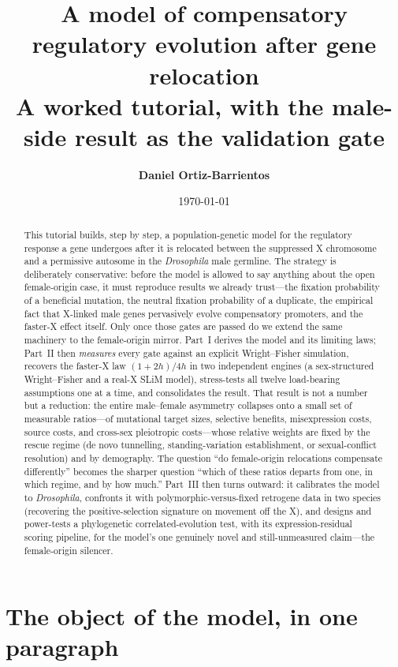 \documentclass[11pt,a4paper]{article}
\title{\textbf{A model of compensatory regulatory evolution after gene relocation}\\[3pt]
\large A worked tutorial, with the male-side result as the validation gate}
\author{\textbf{Daniel Ortiz-Barrientos}}
\date{\today}
\begin{document}
\maketitle

\begin{abstract}
\noindent This tutorial builds, step by step, a population-genetic model for the regulatory response a gene undergoes after it is relocated between the suppressed X chromosome and a permissive autosome in the \emph{Drosophila} male germline. The strategy is deliberately conservative: before the model is allowed to say anything about the open female-origin case, it must reproduce results we already trust---the fixation probability of a beneficial mutation, the neutral fixation probability of a duplicate, the empirical fact that X-linked male genes pervasively evolve compensatory promoters, and the faster-X effect itself. Only once those gates are passed do we extend the same machinery to the female-origin mirror. Part~I derives the model and its limiting laws; Part~II then \emph{measures} every gate against an explicit Wright--Fisher simulation, recovers the faster-X law $(1{+}2h)/4h$ in two independent engines (a sex-structured Wright--Fisher and a real-X SLiM model), stress-tests all twelve load-bearing assumptions one at a time, and consolidates the result. That result is not a number but a reduction: the entire male--female asymmetry collapses onto a small set of measurable ratios---of mutational target sizes, selective benefits, misexpression costs, source costs, and cross-sex pleiotropic costs---whose relative weights are fixed by the rescue regime (de novo tunnelling, standing-variation establishment, or sexual-conflict resolution) and by demography. The question ``do female-origin relocations compensate differently'' becomes the sharper question ``which of these ratios departs from one, in which regime, and by how much.'' Part~III then turns outward: it calibrates the model to \emph{Drosophila}, confronts it with polymorphic-versus-fixed retrogene data in two species (recovering the positive-selection signature on movement off the X), and designs and power-tests a phylogenetic correlated-evolution test, with its expression-residual scoring pipeline, for the model's one genuinely novel and still-unmeasured claim---the female-origin silencer.
\end{abstract}

\tableofcontents

\section{The object of the model, in one paragraph}
\end{document}
